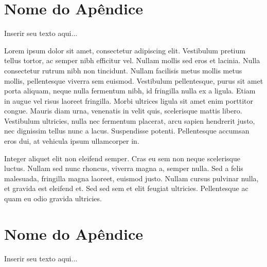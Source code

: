 %
%

\begin{apendicesenv}
\partapendices

\chapter{Nome do Apêndice}
\label{chap:apendicea}

Inserir seu texto aqui...

Lorem ipsum dolor sit amet, consectetur adipiscing elit. Vestibulum pretium tellus tortor, ac semper nibh efficitur vel. Nullam mollis sed eros et lacinia. Nulla consectetur rutrum nibh non tincidunt. Nullam facilisis metus mollis metus mollis, pellentesque viverra sem euismod. Vestibulum pellentesque, purus sit amet porta aliquam, neque nulla fermentum nibh, id fringilla nulla ex a ligula. Etiam in augue vel risus laoreet fringilla. Morbi ultrices ligula sit amet enim porttitor congue. Mauris diam urna, venenatis in velit quis, scelerisque mattis libero. Vestibulum ultricies, nulla nec fermentum placerat, arcu sapien hendrerit justo, nec dignissim tellus nunc a lacus. Suspendisse potenti. Pellentesque accumsan eros dui, at vehicula ipsum ullamcorper in.

Integer aliquet elit non eleifend semper. Cras eu sem non neque scelerisque luctus. Nullam sed nunc rhoncus, viverra magna a, semper nulla. Sed a felis malesuada, fringilla magna laoreet, euismod justo. Nullam cursus pulvinar nulla, et gravida est eleifend et. Sed sed sem et elit feugiat ultricies. Pellentesque ac quam eu odio gravida ultricies.


\chapter{Nome do Apêndice}
\label{chap:apendiceb}

Inserir seu texto aqui...


\end{apendicesenv}
